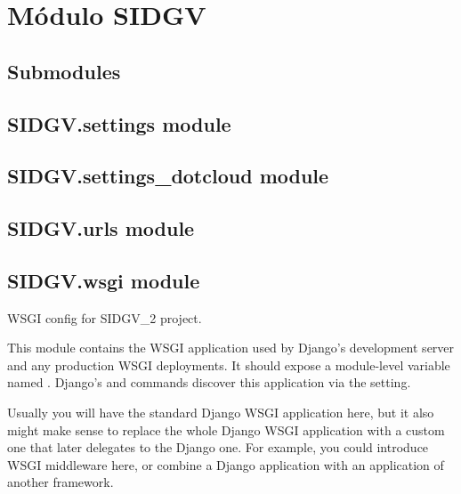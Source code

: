 \documentclass[letterpaper,10pt,spanish]{sphinxmanual}
\begin{document}
\section{Módulo SIDGV}
\label{SIDGV::doc}\label{SIDGV:sidgv-package}

\subsection{Submodules}
\label{SIDGV:submodules}

\subsection{SIDGV.settings module}
\label{SIDGV:module-SIDGV.settings}\label{SIDGV:sidgv-settings-module}

\begin{fulllineitems}
\label{SIDGV:SIDGV.settings.ugettext}
\end{fulllineitems}



\subsection{SIDGV.settings\_dotcloud module}
\label{SIDGV:sidgv-settings-dotcloud-module}

\subsection{SIDGV.urls module}
\label{SIDGV:sidgv-urls-module}\label{SIDGV:module-SIDGV.urls}

\subsection{SIDGV.wsgi module}
\label{SIDGV:module-SIDGV.wsgi}\label{SIDGV:sidgv-wsgi-module}
WSGI config for SIDGV\_2 project.

This module contains the WSGI application used by Django's development server
and any production WSGI deployments. It should expose a module-level variable
named . Django's  and  commands discover
this application via the  setting.

Usually you will have the standard Django WSGI application here, but it also
might make sense to replace the whole Django WSGI application with a custom one
that later delegates to the Django one. For example, you could introduce WSGI
middleware here, or combine a Django application with an application of another
framework.
\end{document}
